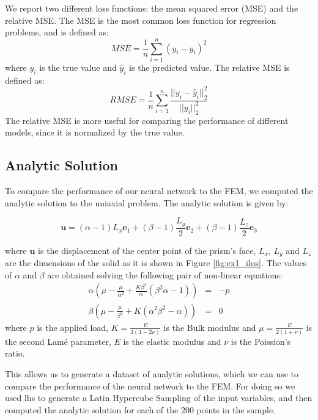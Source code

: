 \documentclass[11pt]{scrartcl} %
\begin{document}
We report two different loss functions: the mean squared error (MSE) and the relative MSE. The MSE is the most common loss function for regression problems, and is defined as:
\begin{equation}
\label{eq:MSE}
MSE = \frac{1}{n} \sum_{i=1}^{n} (y_i - \hat{y}_i)^2
\end{equation}
where $y_i$ is the true value and $\hat{y}_i$ is the predicted value. The relative MSE is defined as:
\begin{equation}
\label{eq:RMSE}
RMSE = \frac{1}{n} \sum_{i=1}^{n} \frac{||y_i - \hat{y}_i||_2^2}{||y_i||_2^2}
\end{equation}
The relative MSE is more useful for comparing the performance of different models, since it is normalized by the true value.

\subsection{Analytic Solution}
To compare the performance of our neural network to the FEM, we computed the analytic solution to the uniaxial problem. The analytic solution is given by:

\begin{equation}
\label{eq:analytic_solution}
\boldsymbol{u} = 
(\alpha - 1)L_x \boldsymbol{e}_1 
+   
(\beta - 1) \frac{L_y}{2}  \boldsymbol{e}_2 
+   
(\beta - 1)\frac{L_z}{2} \boldsymbol{e}_3 
\end{equation}

where $\boldsymbol{u}$ is the displacement of the center point of the prism's face, $L_x$, $L_y$ and $L_z$ are the dimensions of the solid as it is shown in Figure \ref{fig:ex1_ilus}. The values of $\alpha$ and $\beta$ are obtained solving the following pair of non-linear equations:
%
\begin{eqnarray}
\alpha \left( 
\mu -  \frac{\mu}{\alpha^2} + \frac{K\beta^2}{\alpha} (\beta^2 \alpha -1)  
\right) &=& - p \\
\beta \left( 
	\mu -  \frac{\mu}{\beta^2} + K (\alpha^2\beta^2 - \alpha) 
 \right) &=& 0
\end{eqnarray}
%
where  $p$ is the applied load, $K = \frac{E}{3(1 - 2\nu)}$ is the Bulk modulus and $\mu = \frac{E}{2(1 + \nu)}$ is the second Lamé parameter, $E$ is the elastic modulus and $\nu$ is the Poission's ratio. 



This allows us to generate a dataset of analytic solutions, which we can use to compare the performance of the neural network to the FEM. For doing so we used lhs to generate a Latin Hypercube Sampling of the input variables, and then computed the analytic solution for each of the 200 points in the sample.
\end{document}
